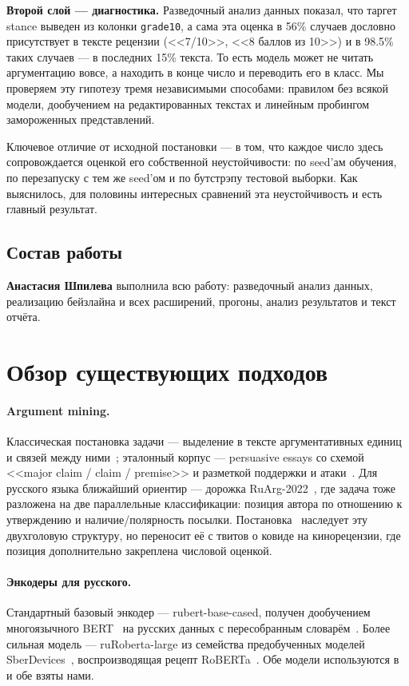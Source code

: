 \documentclass{article}
\begin{document}
\textbf{Второй слой --- диагностика.} Разведочный анализ данных показал, что таргет stance
выведен из колонки \texttt{grade10}, а сама эта оценка в 56\% случаев дословно присутствует
в тексте рецензии (<<7/10>>, <<8 баллов из 10>>) и в 98.5\% таких случаев --- в последних
15\% текста. То есть модель может не читать аргументацию вовсе, а находить в конце число
и переводить его в класс. Мы проверяем эту гипотезу тремя независимыми способами:
правилом без всякой модели, дообучением на редактированных текстах и линейным пробингом
замороженных представлений.

Ключевое отличие от исходной постановки --- в том, что каждое число здесь сопровождается
оценкой его собственной неустойчивости: по seed'ам обучения, по перезапуску с тем же seed'ом
и по бутстрэпу тестовой выборки. Как выяснилось, для половины интересных сравнений эта
неустойчивость и есть главный результат.

\subsection{Состав работы}

\textbf{Анастасия Шпилева} выполнила всю работу: разведочный анализ данных, реализацию
бейзлайна и всех расширений, прогоны, анализ результатов и текст отчёта.

\section{Обзор существующих подходов}
\label{sec:related}

\paragraph{Argument mining.} Классическая постановка задачи --- выделение в тексте
аргументативных единиц и связей между ними~\cite{mochales2011argumentation,lippi2016argumentation};
эталонный корпус --- persuasive essays со схемой <<major claim / claim / premise>> и
разметкой поддержки и атаки~\cite{stab2017parsing}. Для русского языка ближайший ориентир ---
дорожка RuArg-2022~\cite{kotelnikov2022ruarg}, где задача тоже разложена на две параллельные
классификации: позиция автора по отношению к утверждению и наличие/полярность посылки.
Постановка~\cite{serbina2026argument} наследует эту двухголовую структуру, но переносит её
с твитов о ковиде на кинорецензии, где позиция дополнительно закреплена числовой оценкой.

\paragraph{Энкодеры для русского.} Стандартный базовый энкодер --- rubert-base-cased,
получен дообучением многоязычного BERT~\cite{devlin2019bert} на русских данных с
пересобранным словарём~\cite{kuratov2019adaptation}. Более сильная модель ---
ruRoberta-large из семейства предобученных моделей SberDevices~\cite{zmitrovich2024family},
воспроизводящая рецепт RoBERTa~\cite{liu2019roberta}. Обе модели используются
в~\cite{serbina2026argument} и обе взяты нами.
\end{document}
